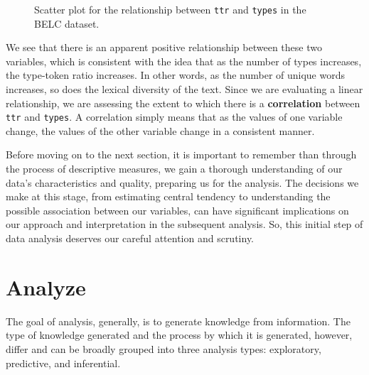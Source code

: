 \documentclass[
  letterpaper,
]{latex/krantz}
\theoremstyle{definition}
\theoremstyle{remark}
\begin{document}
\begin{figure}[H]
\begin{minipage}{0.50\linewidth}
{}


\end{minipage}%

\caption{\label{fig-aa-belc-scatter-plot}Scatter plot for the
relationship between \texttt{ttr} and \texttt{types} in the BELC
dataset.}

\end{figure}%

We see that there is an apparent positive relationship between these two
variables, which is consistent with the idea that as the number of types
increases, the type-token ratio increases. In other words, as the number
of unique words increases, so does the lexical diversity of the text.
Since we are evaluating a linear relationship, we are assessing the
extent to which there is a \textbf{correlation} between \texttt{ttr} and
\texttt{types}. A correlation simply means that as the values of one
variable change, the values of the other variable change in a consistent
manner.

Before moving on to the next section, it is important to remember than
through the process of descriptive measures, we gain a thorough
understanding of our data's characteristics and quality, preparing us
for the analysis. The decisions we make at this stage, from estimating
central tendency to understanding the possible association between our
variables, can have significant implications on our approach and
interpretation in the subsequent analysis. So, this initial step of data
analysis deserves our careful attention and scrutiny.

\section{Analyze}\label{sec-aa-analyze}

The goal of analysis, generally, is to generate knowledge from
information. The type of knowledge generated and the process by which it
is generated, however, differ and can be broadly grouped into three
analysis types: exploratory, predictive, and inferential.
\end{document}
